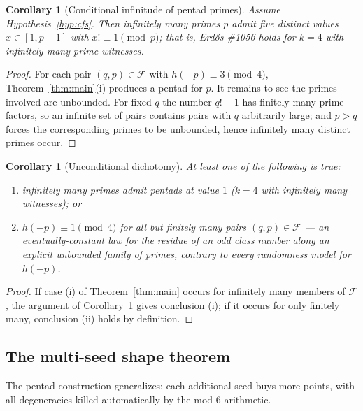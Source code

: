 \documentclass[11pt]{article}
\newtheorem{corollary}[theorem]{Corollary}
\theoremstyle{definition}
\theoremstyle{remark}
\begin{document}
\begin{corollary}[Conditional infinitude of pentad primes]\label{cor:cond}
Assume Hypothesis~\ref{hyp:cfs}. Then infinitely many primes $p$ admit five
distinct values $x \in [1, p-1]$ with $x! \equiv 1 \pmod p$; that is,
Erd\H{o}s \#1056 holds for $k = 4$ with infinitely many prime witnesses.
\end{corollary}

\begin{proof}
For each pair $(q, p) \in \mathcal F$ with $h(-p) \equiv 3 \pmod 4$,
Theorem~\ref{thm:main}(i) produces a pentad for $p$. It remains to see the
primes involved are unbounded. For fixed $q$ the number $q!-1$ has finitely
many prime factors, so an infinite set of pairs contains pairs with $q$
arbitrarily large; and $p > q$ forces the corresponding primes to be
unbounded, hence infinitely many distinct primes occur.
\end{proof}

\begin{corollary}[Unconditional dichotomy]\label{cor:dichotomy}
At least one of the following is true:
\begin{enumerate}
  \item[(i)] infinitely many primes admit pentads at value $1$ ($k = 4$
    with infinitely many witnesses); or
  \item[(ii)] $h(-p) \equiv 1 \pmod 4$ for all but finitely many pairs
    $(q, p) \in \mathcal F$ --- an eventually-constant law for the residue
    of an odd class number along an explicit unbounded family of primes,
    contrary to every randomness model for $h(-p)$.
\end{enumerate}
\end{corollary}

\begin{proof}
If case (i) of Theorem~\ref{thm:main} occurs for infinitely many members of
$\mathcal F$, the argument of Corollary~\ref{cor:cond} gives conclusion (i);
if it occurs for only finitely many, conclusion (ii) holds by definition.
\end{proof}

\subsection{The multi-seed shape theorem}

The pentad construction generalizes: each additional seed buys more points,
with all degeneracies killed automatically by the mod-$6$ arithmetic.
\end{document}
